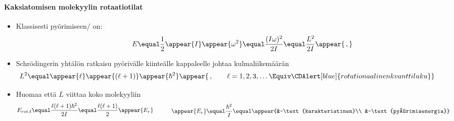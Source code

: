 \begin{frame}
\frametitle{\texorpdfstring{\culine[\sectiontitleulinecolor]{\sectiontitle}}{\sectiontitle} }
\framesubtitle{Kaksiatomisen molekyylin rotaatiotilat}
\appear{}

\seminormal
\vspace{1mm}
\begin{minipage}{9.5cm}
	\begin{itemize}[itemsep=1.6mm]
	\item Klassisesti pyörimiseen/  on:\vspace{-3mm}  
\[
\hspace{1.5cm} E  \equal \frac{1}{2} \appear{I} \appear{\omega^{2}}  \equal \frac{(I \omega)^{2}}{2 I}  \equal \frac{L^{2}}{2 I} \appear{\,,} 
\] \vspace{1mm} 

\item Schrödingerin yhtälön ratkaisu pyörivälle kiin\-teäl\-le kappaleelle johtaa kulmaliikemäärän\\  
\[ 
 L^{2}  \equal \appear{\ell} \appear{(\ell+1)} \appear{\hbar^{2}} \appear{\,, \qquad \ell=1,2,3, \ldots\Equiv \CDAlert[blue]{rotationaalinen kvanttiluku}} 
 \]
 \end{itemize}
\end{minipage}

\begin{itemize}
\item Huomaa että $L$ viittaa koko molekyyliin\vspace{-2mm} 
\[ 
 E_{r o t, \ell}  \equal \frac{\ell(\ell+1) \hbar^{2}}{2 I}  \equal \frac{\ell(\ell+1)}{2} \appear{E_{r}}  \quad  \qquad 
 \begin{aligned}
 \appear{E_r}  \equal  \frac{\hbar^2}{I}  \equal \appear{&~\text{karakteristinen}\\
 	&~\text{pyörimisenergia}}
 \end{aligned}
 \] %
\end{itemize}


\end{frame}
